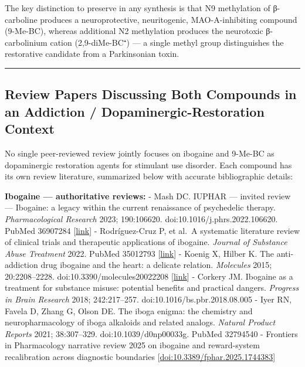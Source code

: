 The key distinction to preserve in any synthesis is that N9 methylation of β-carboline produces a neuroprotective, neuritogenic, MAO-A-inhibiting compound (9-Me-BC), whereas additional N2 methylation produces the neurotoxic β-carbolinium cation (2,9-diMe-BC⁺) --- a single methyl group distinguishes the restorative candidate from a Parkinsonian toxin.

\begin{center}\rule{0.5\linewidth}{0.5pt}\end{center}

\subsection{Review Papers Discussing Both Compounds in an Addiction / Dopaminergic-Restoration Context}\label{20_ibogaine-review-papers-discussing-both-compounds-in-an-addiction-dopaminergic-restoration-context}

No single peer-reviewed review jointly focuses on ibogaine and 9-Me-BC as dopaminergic restoration agents for stimulant use disorder. Each compound has its own review literature, summarized below with accurate bibliographic details:

\textbf{Ibogaine --- authoritative reviews:} - Mash DC. IUPHAR --- invited review --- Ibogaine: a legacy within the current renaissance of psychedelic therapy. \emph{Pharmacological Research} 2023; 190:106620. doi:10.1016/j.phrs.2022.106620. PubMed 36907284 {[}\href{https://pubmed.ncbi.nlm.nih.gov/36907284/}{link}{]} - Rodríguez-Cruz P, et al.~A systematic literature review of clinical trials and therapeutic applications of ibogaine. \emph{Journal of Substance Abuse Treatment} 2022. PubMed 35012793 {[}\href{https://www.jsatjournal.com/article/S0740-5472(21)00443-8/fulltext}{link}{]} - Koenig X, Hilber K. The anti-addiction drug ibogaine and the heart: a delicate relation. \emph{Molecules} 2015; 20:2208--2228. doi:10.3390/molecules20022208 {[}\href{https://www.mdpi.com/1420-3049/20/2/2208}{link}{]} - Corkery JM. Ibogaine as a treatment for substance misuse: potential benefits and practical dangers. \emph{Progress in Brain Research} 2018; 242:217--257. doi:10.1016/bs.pbr.2018.08.005 - Iyer RN, Favela D, Zhang G, Olson DE. The iboga enigma: the chemistry and neuropharmacology of iboga alkaloids and related analogs. \emph{Natural Product Reports} 2021; 38:307--329. doi:10.1039/d0np00033g. PubMed 32794540 - Frontiers in Pharmacology narrative review 2025 on ibogaine and reward-system recalibration across diagnostic boundaries {[}\href{https://www.frontiersin.org/journals/pharmacology/articles/10.3389/fphar.2025.1744383/full}{doi:10.3389/fphar.2025.1744383}{]}

